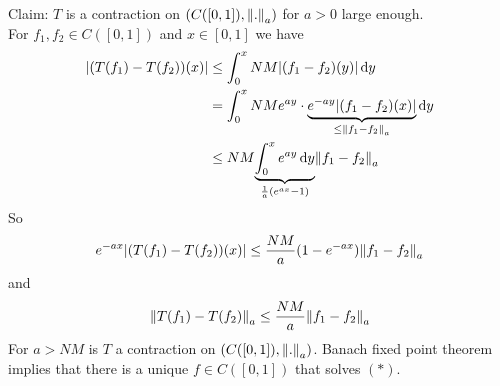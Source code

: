 \begin{beispiel}
	Claim: $T$ is a contraction on $(C([0,1]),\norm{.}_a)$ for $a >0$ large enough. \\
	For $f_1,f_2 \in C([0,1])$ and $x \in [0,1]$ we have
	\begin{align*}
		\abs{(T(f_1)-T(f_2))(x)} &\leq \int_{0}^{x} NM \abs{(f_1-f_2)(y)} \,\mathrm{d}y \\
		&= \int_{0}^{x}NM e^{ay} \cdot \underset{\leq \norm{f_1-f_2}_a}{\underbrace{e^{-ay} \abs{(f_1-f_2)(x)}}} \,\mathrm{d}y \\
		&\leq NM \underset{\frac{1}{a}(e^{ax}-1)}{\underbrace{\int_{0}^{x} e^{ay} \,\mathrm{d}y}} \norm{f_1-f_2}_a 
	\end{align*}
	So
	\[
		e^{-ax} \abs{(T(f_1)-T(f_2))(x)} \leq \frac{NM}{a}(1-e^{-ax})\norm{f_1-f_2}_a
	\]
	and
	\[
		\norm{T(f_1)-T(f_2)}_a \leq  \frac{NM}{a} \norm{f_1-f_2}_a
	\]
	For $a > NM$ is $T$ a contraction on $(C([0,1]),\norm{.}_a)$. Banach fixed point theorem implies that there is a unique $f \in C([0,1])$ that solves $(*)$.
\end{beispiel}
\cleardoubleoddemptypage
{}
\setcounter{page}{1}

